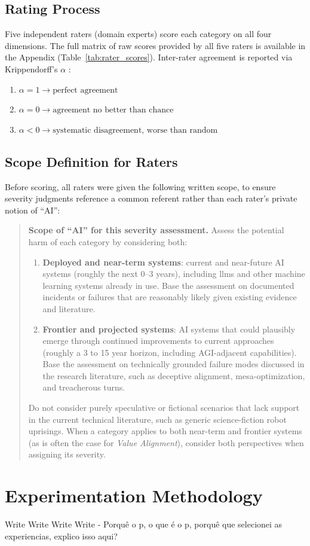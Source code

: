 \begin{toreview}
	\subsection*{Rating Process}

	Five independent raters (domain experts) score each category on all four dimensions. The full matrix of raw scores provided by all five raters is available in the Appendix (Table~\ref{tab:rater_scores}). Inter-rater agreement is reported via Krippendorff's $\alpha$ \cite{krippendorff2018content, hayes2007answering}:

	\begin{enumerate}
		\item $\alpha = 1 \to \text{perfect agreement}$
		\item $\alpha = 0 \to \text{agreement no better than chance}$
		\item $\alpha < 0 \to \text{systematic disagreement, worse than random}$
	\end{enumerate}

	\subsection*{Scope Definition for Raters}

	Before scoring, all raters were given the following written scope, to ensure severity judgments reference a common referent rather than each rater's private notion of ``AI'':

	\begin{quote}
	\textbf{Scope of ``AI'' for this severity assessment.} Assess the potential harm of each category by considering both:

	\begin{enumerate}
		\item \textbf{Deployed and near-term systems}: current and near-future AI systems (roughly the next 0--3 years), including \glspl{llm} and other machine learning systems already in use. Base the assessment on documented incidents or failures that are reasonably likely given existing evidence and literature.

		\item \textbf{Frontier and projected systems}: AI systems that could plausibly emerge through continued improvements to current approaches (roughly a 3 to 15 year horizon, including AGI-adjacent capabilities). Base the assessment on technically grounded failure modes discussed in the research literature, such as deceptive alignment, mesa-optimization, and treacherous turns.
	\end{enumerate}

	Do not consider purely speculative or fictional scenarios that lack support in the current technical literature, such as generic science-fiction robot uprisings. When a category applies to both near-term and frontier systems (as is often the case for \emph{Value Alignment}), consider both perspectives when assigning its severity.
	\end{quote}

\end{toreview}

	\section{Experimentation Methodology}

	Write Write Write Write - Porquê o p, o que é o p, porquê que selecionei as experiencias, explico isso aqui?